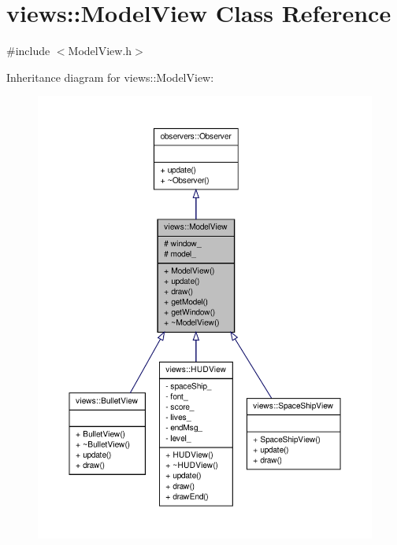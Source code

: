 \hypertarget{classviews_1_1ModelView}{\section{views\-:\-:\-Model\-View \-Class \-Reference}
\label{d8/d67/classviews_1_1ModelView}
}


{\ttfamily \#include $<$\-Model\-View.\-h$>$}



\-Inheritance diagram for views\-:\-:\-Model\-View\-:\nopagebreak
\begin{figure}[H]
\begin{center}
\leavevmode
\includegraphics[width=350pt]{dd/dda/classviews_1_1ModelView__inherit__graph}
\end{center}
\end{figure}


